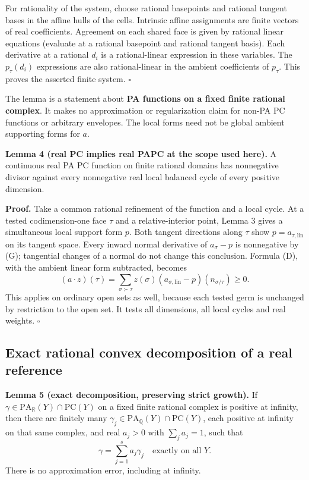 \documentclass[
  11pt,
]{article}
\begin{document}
For rationality of the system, choose rational basepoints and rational
tangent bases in the affine hulls of the cells. Intrinsic affine
assignments are finite vectors of real coefficients. Agreement on each
shared face is given by rational linear equations (evaluate at a
rational basepoint and rational tangent basis). Each derivative at a
rational \(d_i\) is a rational-linear expression in these variables. The
\(p_\tau(d_i)\) expressions are also rational-linear in the ambient
coefficients of \(p_\tau\). This proves the asserted finite system.
\(\square\)

The lemma is a statement about \textbf{PA functions on a fixed finite
rational complex}. It makes no approximation or regularization claim for
non-PA PC functions or arbitrary envelopes. The local forms need not be
global ambient supporting forms for \(a\).

\textbf{Lemma 4 (real PC implies real PAPC at the scope used here).} A
continuous real PA PC function on finite rational domains has
nonnegative divisor against every nonnegative real local balanced cycle
of every positive dimension.

\textbf{Proof.} Take a common rational refinement of the function and a
local cycle. At a tested codimension-one face \(\tau\) and a
relative-interior point, Lemma 3 gives a simultaneous local support form
\(p\). Both tangent directions along \(\tau\) show
\(p=a_{\tau,\mathrm{lin}}\) on its tangent space. Every inward normal
derivative of \(a_\sigma-p\) is nonnegative by (G); tangential changes
of a normal do not change this conclusion. Formula (D), with the ambient
linear form subtracted, becomes \[
(a\cdot z)(\tau)=\sum_{\sigma\succ\tau}z(\sigma)
(a_{\sigma,\mathrm{lin}}-p)(n_{\sigma/\tau})\geq0.
\] This applies on ordinary open sets as well, because each tested germ
is unchanged by restriction to the open set. It tests all dimensions,
all local cycles and real weights. \(\square\)

\subsection{Exact rational convex decomposition of a real
reference}\label{exact-rational-convex-decomposition-of-a-real-reference}

\textbf{Lemma 5 (exact decomposition, preserving strict growth).} If
\(\gamma\in\mathrm{PA}_{\mathbb R}(Y)\cap\mathrm{PC}(Y)\) on a fixed
finite rational complex is positive at infinity, then there are finitely
many \(\gamma_j\in\mathrm{PA}_{\mathbb Q}(Y)\cap\mathrm{PC}(Y)\), each
positive at infinity on that same complex, and real \(a_j>0\) with
\(\sum_j a_j=1\), such that \[
\gamma=\sum_{j=1}^s a_j\gamma_j\quad\text{exactly on all }Y.
\tag{R}
\] There is no approximation error, including at infinity.
\end{document}
